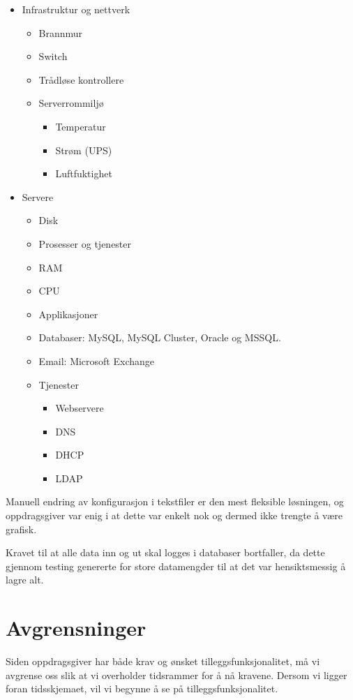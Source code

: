 \begin{itemize}
	\item Infrastruktur og nettverk
	\begin{itemize}
		\item Brannmur
		\item Switch
		\item Trådløse kontrollere
		\item Serverrommiljø
		\begin{itemize}
			\item Temperatur
			\item Strøm (UPS)
			\item Luftfuktighet
		\end{itemize}
	\end{itemize}
	\item Servere
	\begin{itemize}
		\item Disk
		\item Prosesser og tjenester
		\item RAM
		\item CPU
		\item Applikasjoner
		\item Databaser: MySQL, MySQL Cluster, Oracle og MSSQL.
		\item Email: Microsoft Exchange
		\item Tjenester
		\begin{itemize}
			\item Webservere
			\item DNS 
			\item DHCP
			\item LDAP
		\end{itemize}
	\end{itemize}
\end{itemize}

Manuell endring av konfigurasjon i tekstfiler er den mest fleksible løsningen, og oppdragsgiver var enig i at dette var enkelt nok og dermed ikke trengte å være grafisk.

Kravet til at alle data inn og ut skal logges i databaser bortfaller, da dette gjennom testing genererte for store datamengder til at det var hensiktsmessig å lagre alt.

\section{Avgrensninger}
Siden oppdragsgiver har både krav og ønsket tilleggsfunksjonalitet, må vi avgrense oss slik at vi overholder tidsrammer for å nå kravene. Dersom vi ligger foran tidsskjemaet, vil vi begynne å se på tilleggsfunksjonalitet.

